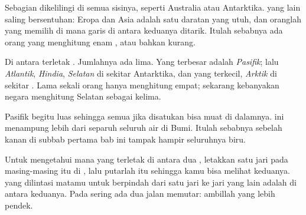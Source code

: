\begin{remark}\label{rem:g3:continents-and-oceans:where}
Sebagian  dikelilingi  di semua sisinya, seperti Australia atau
Antarktika.  yang lain saling bersentuhan: Eropa dan Asia adalah satu
daratan yang utuh, dan oranglah yang memilih di mana garis di antara
keduanya ditarik. Itulah sebabnya ada orang yang menghitung enam ,
atau bahkan kurang.
\end{remark}

Di antara  terletak . Jumlahnya ada lima. Yang
terbesar adalah \emph{ Pasifik}; lalu \emph{ Atlantik},
\emph{ Hindia}, \emph{ Selatan} di sekitar Antarktika, dan
yang terkecil, \emph{ Arktik} di sekitar . Lama sekali
orang hanya menghitung empat; sekarang kebanyakan negara menghitung
 Selatan sebagai  kelima.

\begin{example}\label{ex:g3:continents-and-oceans:pacific}
 Pasifik begitu luas sehingga semua  jika disatukan bisa muat di
dalamnya.  ini menampung lebih dari separuh seluruh air  di
Bumi. Itulah sebabnya  sebelah kanan di subbab pertama bab ini
tampak hampir seluruhnya biru.
\end{example}

\begin{method}\label{met:g3:continents-and-oceans:between}
Untuk mengetahui  mana yang terletak di antara dua , letakkan
satu jari pada masing-masing  itu di , lalu putarlah  itu sehingga kamu bisa melihat keduanya.  yang dilintasi
matamu untuk berpindah dari satu jari ke jari yang lain adalah  di
antara keduanya. Pada  sering ada dua jalan memutar: ambillah
yang lebih pendek.
\end{method}

